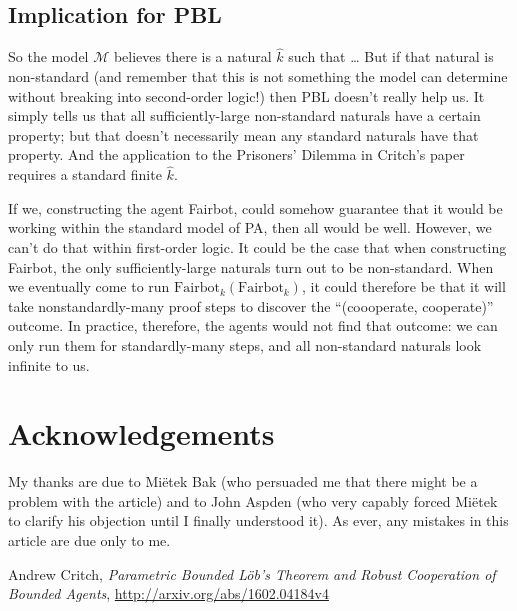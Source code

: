 \documentclass[11pt]{amsart}
\begin{document}
\subsection{Implication for PBL}

So the model $\mathcal{M}$ believes there is a natural $\hat{k}$ such that \dots
But if that natural is non-standard (and remember that this is not something the model can determine without breaking into second-order logic!)
then PBL doesn't really help us.
It simply tells us that all sufficiently-large non-standard naturals have a certain property; but that doesn't necessarily mean any standard naturals have that property.
And the application to the Prisoners' Dilemma in Critch's paper requires a standard finite $\hat{k}$.

If we, constructing the agent Fairbot, could somehow guarantee that it would be working within the standard model of PA, then all would be well.
However, we can't do that within first-order logic.
It could be the case that when constructing Fairbot, the only sufficiently-large naturals turn out to be non-standard.
When we eventually come to run $\mathrm{Fairbot}_k(\mathrm{Fairbot}_k)$, it could therefore be that it will take nonstandardly-many proof steps to discover the ``(coooperate, cooperate)'' outcome.
In practice, therefore, the agents would not find that outcome: we can only run them for standardly-many steps, and all non-standard naturals look infinite to us.


\section{Acknowledgements}
My thanks are due to Mi\"etek Bak (who persuaded me that there might be a problem with the article)
and to John Aspden (who very capably forced Mi\"etek to clarify his objection until I finally understood it).
As ever, any mistakes in this article are due only to me.

\begin{thebibliography}{9}
  
  Andrew Critch,
  \emph{Parametric Bounded L\"ob's Theorem and Robust Cooperation of Bounded Agents},
  \url{http://arxiv.org/abs/1602.04184v4}

\end{thebibliography}
\end{document}

